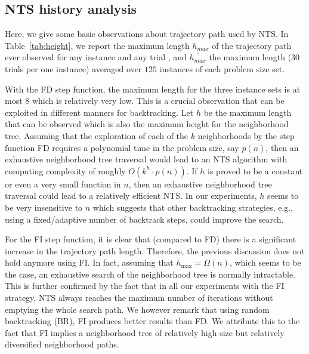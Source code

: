 \documentclass{acm_proc_article-sp}
\begin{document}
\subsection{NTS history analysis}
Here, we give some basic observations about trajectory path used by NTS. In Table~\ref{tab:height}, we report the maximum length $h_{max}$ of the trajectory path ever observed for any instance and any trial , and $\overline{h_{max}}$ the maximum length ($30$ trials per one instance) averaged over $125$ instances of each problem size set.

With the FD step function, the maximum length for the three instance sets is at most $8$ which is relatively very low. This is a crucial observation that can be exploited in different manners for backtracking. Let $h$ be the maximum length that can be observed which is also the maximum height for the neighborhood tree. Assuming that the exploration of each of the $k$ neighborhoods by the step function FD requires a polynomial time in the problem size, say $p(n)$, then an exhaustive neighborhood tree traversal would lead to an NTS algorithm with computing complexity of roughly $O(k^h \cdot p(n))$. If $h$ is proved to be a constant or even a very small function in $n$, then an exhaustive neighborhood tree traversal could lead to a relatively efficient NTS. In our experiments, $h$ seems to be very insensitive to $n$ which suggests that other backtracking strategies, e.g., using a fixed/adaptive number of backtrack steps, could improve the search.

For the FI step function, it is clear that (compared to FD) there is a significant increase in the trajectory path length. Therefore, the previous discussion does not hold anymore using FI. In fact, assuming that $h_{\max}=\Omega(n)$, which seems to be the case, an exhaustive search of the neighborhood tree is normally intractable. This is further confirmed by the fact that in all our experiments with the FI strategy, NTS always reaches the maximum number of iterations without emptying the whole search path. We however remark that using random backtracking (BR), FI produces better results than FD. We attribute this to the fact that FI implies a neighborhood tree of relatively high size but relatively diversified neighborhood paths.
\end{document}
